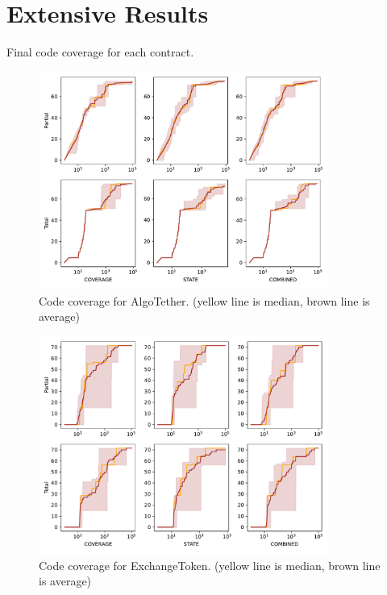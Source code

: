 
\chapter{Extensive Results}\label{chapter:extensive-results}

\begin{table}[htbp]
    \centering
    \caption{Final code coverage for each contract.}\label{table:covs}
\end{table}


\begin{figure}[htbp]
    \centering
    \includegraphics*[width=0.85\textwidth]{charts/AlgoTether_range.pdf}
    \caption{Code coverage for AlgoTether. (yellow line is median, brown line is average)}
    \label{fig:AlgoTether range}
\end{figure}


\begin{figure}[htbp]
    \centering
    \includegraphics*[width=0.85\textwidth]{charts/ExchangeToken_range.pdf}
    \caption{Code coverage for ExchangeToken. (yellow line is median, brown line is average)}
    \label{fig:ExchangeToken range}
\end{figure}